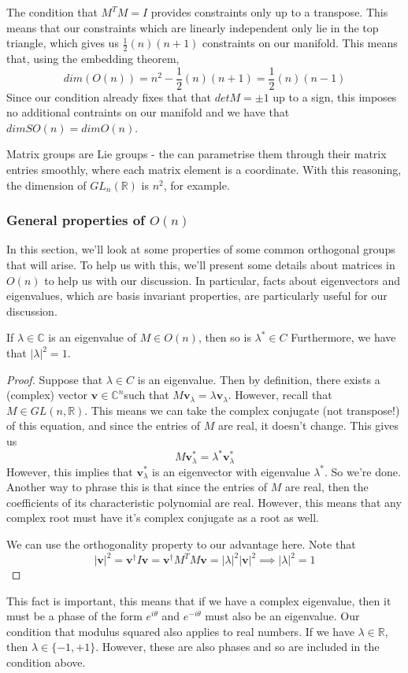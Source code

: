 The condition that $M^T M = I$ provides constraints only up to a transpose. This means that our constraints which are linearly independent only lie in the top triangle, which gives us $\frac{1}{ 2} ( n ) ( n + 1 ) $ constraints on our manifold. This means that, using the embedding theorem, 
\[ 
dim ( O (n) ) = n^2  - \frac{1}{2} ( n ) ( n + 1 )  = \frac{1}{2}( n )( n - 1) 
\] 
Since our condition already fixes that that $ det M  = \pm 1 $ up to a sign, this imposes no additional contraints on our manifold and we have that 
$dim SO( n )  = dim O(n)$. 

Matrix groups are Lie groups - the can parametrise them through their matrix entries smoothly, where each matrix element is a coordinate. With this reasoning, the dimension of $GL_n(\mathbb{R})$ is $n^2$, for example. 

\subsubsection{General properties of $O(n)$ } 
In this section, we'll look at some properties of some common orthogonal groups that will arise. To help us with this, we'll present some details about matrices in $ O (n) $ to help us with our discussion. In particular, facts about eigenvectors and eigenvalues, which are basis invariant properties, are particularly useful for our discussion. 

\begin{thm}

If $\lambda \in \mathbb{C}$ is an eigenvalue of $M \in O (n) $, then so is $\lambda^* \in C$ Furthermore, we have that $|\lambda|^ 2 = 1$. 
\begin{proof} 
Suppose that $\lambda \in C$ is an eigenvalue. Then by definition, there exists a (complex) vector $\mathbf{v} \in \mathbb{ C}^n $such that $M \mathbf{v}_\lambda = \lambda \mathbf{v}_\lambda $. However, recall that $M \in GL ( n , \mathbb{ R})$. This means we can take the complex conjugate (not transpose!) of this equation, and since the entries of $M$ are real, it doesn't change. This gives us 
\[ 
M \mathbf{v}_\lambda^* = \lambda^* \mathbf{v}_\lambda^* 
\] However, this implies that $ \mathbf{v}_\lambda^*$ is an eigenvector with eigenvalue $\lambda^*$. So we're done. Another way to phrase this is that since the entries of $M $ are real, then the coefficients of its characteristic polynomial are real. However, this means that any complex root must have it's complex conjugate as a root as well. 

We can use the orthogonality property to our advantage here. Note that 
\[
	|\mathbf{v}|^2 = \mathbf{v}^\dagger I \mathbf{v} = \mathbf{v}^\dagger M^T M \mathbf{v} = |\lambda|^2 |\mathbf{v}|^2 \implies |\lambda|^2  = 1
\] 
\end{proof}
\end{thm} 
This fact is important, this means that if we have a complex eigenvalue, then it must be a phase of the form $e^{ i \theta} $ and $e^{  - i \theta} $ must also be an eigenvalue. Our condition that modulus squared also applies to real numbers. If we have $\lambda \in \mathbb{ R}$, then $\lambda \in \{ -1, + 1 \}$. However, these are also phases and so are included in the condition above. 

